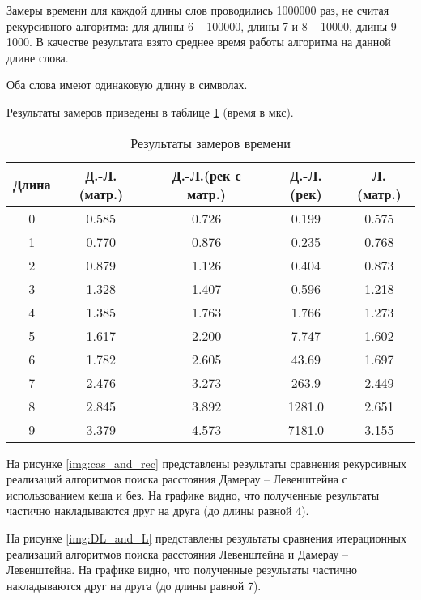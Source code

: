 Замеры времени для каждой длины слов проводились 1000000 раз, не считая рекурсивного алгоритма: для длины 6 -- 100000, длины 7 и 8 -- 10000, длины 9 -- 1000. В качестве результата взято среднее время работы алгоритма на данной длине слова.

Оба слова имеют одинаковую длину в символах.

Результаты замеров приведены в таблице \ref{tab:time} (время в мкс).

\begin{table}[h]
	\begin{center}
		\caption{\label{tab:time}Результаты замеров времени}
		\begin{tabular}{|c|c|c|c|c|}
			
			\hline
			Длина & Д.-Л.(матр.)& Д.-Л.(рек с матр.) & Д.-Л.(рек)  & Л.(матр.)  \\
			\hline
			0 & 0.585 & 0.726 & 0.199 & 0.575 \\
			\hline
			1 & 0.770 & 0.876 & 0.235 & 0.768 \\
			\hline
			2 & 0.879 & 1.126 & 0.404 & 0.873 \\
			\hline
			3 & 1.328 & 1.407 & 0.596 & 1.218 \\
			\hline
			4 & 1.385 & 1.763 & 1.766 & 1.273 \\
			\hline
			5 & 1.617 & 2.200 & 7.747 & 1.602 \\
			\hline
			6 & 1.782 & 2.605 & 43.69 & 1.697 \\
			\hline
			7 & 2.476 & 3.273 & 263.9 & 2.449 \\
			\hline
			8 & 2.845 & 3.892 & 1281.0 & 2.651 \\
			\hline
			9 & 3.379 & 4.573 & 7181.0 & 3.155 \\
			\hline
		\end{tabular}
	\end{center}
\end{table}

\FloatBarrier

На рисунке \ref{img:cas_and_rec} представлены результаты сравнения рекурсивных реализаций алгоритмов поиска расстояния Дамерау -- Левенштейна с использованием кеша и без. На графике видно, что полученные результаты частично накладываются друг на друга (до длины равной 4).


\FloatBarrier

На рисунке \ref{img:DL_and_L} представлены результаты сравнения итерационных реализаций алгоритмов поиска расстояния Левенштейна и Дамерау -- Левенштейна. На графике видно, что полученные результаты частично накладываются друг на друга (до длины равной 7).

